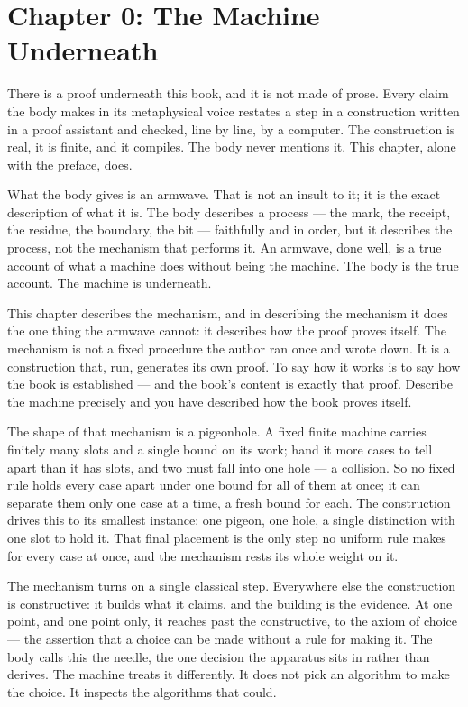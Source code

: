 \chapter*{Chapter 0: The Machine Underneath}

There is a proof underneath this book, and it is not made of prose. Every claim the body makes
in its metaphysical voice restates a step in a construction written in a proof assistant and
checked, line by line, by a computer. The construction is real, it is finite, and it compiles.
The body never mentions it. This chapter, alone with the preface, does.

What the body gives is an armwave. That is not an insult to it; it is the exact description of
what it is. The body describes a process --- the mark, the receipt, the residue, the boundary,
the bit --- faithfully and in order, but it describes the process, not the mechanism that
performs it. An armwave, done well, is a true account of what a machine does without being the
machine. The body is the true account. The machine is underneath.

This chapter describes the mechanism, and in describing the mechanism it does the one thing the
armwave cannot: it describes how the proof proves itself. The mechanism is not a fixed procedure
the author ran once and wrote down. It is a construction that, run, generates its own proof. To
say how it works is to say how the book is established --- and the book's content is exactly that
proof. Describe the machine precisely and you have described how the book proves itself.

The shape of that mechanism is a pigeonhole. A fixed finite machine carries finitely many slots and
a single bound on its work; hand it more cases to tell apart than it has slots, and two must fall
into one hole --- a collision. So no fixed rule holds every case apart under one bound for all of
them at once; it can separate them only one case at a time, a fresh bound for each. The construction
drives this to its smallest instance: one pigeon, one hole, a single distinction with one slot to
hold it. That final placement is the only step no uniform rule makes for every case at once, and the
mechanism rests its whole weight on it.

The mechanism turns on a single classical step. Everywhere else the construction is
constructive: it builds what it claims, and the building is the evidence. At one point, and one
point only, it reaches past the constructive, to the axiom of choice --- the assertion that a
choice can be made without a rule for making it. The body calls this the needle, the one decision
the apparatus sits in rather than derives. The machine treats it differently. It does not pick an
algorithm to make the choice. It inspects the algorithms that could.


